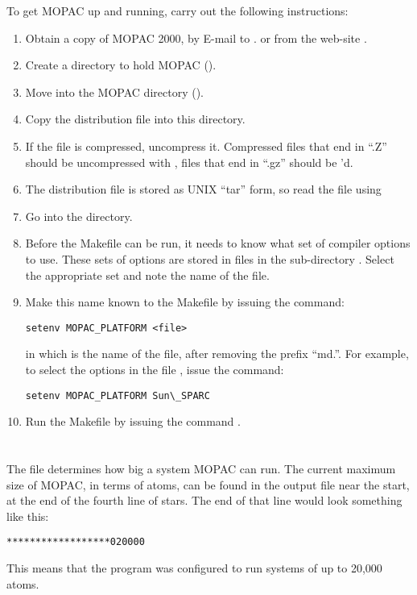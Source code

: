 To get MOPAC up and running, carry out the following instructions:
\begin{enumerate}
\item Obtain a copy of MOPAC 2000, by E-mail to 
.
or from the web-site 
.
\item Create a directory to hold MOPAC ().
\item Move into the MOPAC directory ().
\item Copy the distribution file into this directory.
\item If the file is compressed, uncompress it.  Compressed files that end in
``.Z'' should be uncompressed with , files that end in ``.gz''
should be 'd.
\item The distribution file is stored as UNIX ``tar'' form, so read the file
using 
\item Go into the  directory.
\item  Before the Makefile can be run, it needs to know what set of compiler
options to use. These sets of options are stored in files in the sub-directory 
.  Select the appropriate set and note the name of the
file.
\item Make this name known to the Makefile by issuing the command:
\begin{verbatim}
setenv MOPAC_PLATFORM <file>
\end{verbatim}
in which  is the name of the file, after removing the prefix
``md.''.
For example, to select the options in the file , issue the command:
\begin{verbatim}
setenv MOPAC_PLATFORM Sun\_SPARC
\end{verbatim}
\item Run the Makefile by issuing the command .
\end{enumerate}

\section{} \label{sizes}
The file  determines how big a system MOPAC can run.  
The current maximum size of MOPAC, in terms of atoms, can be
found in the output file near the start, at the end of the fourth line
of stars.  The end of that line would look something like this:
\begin{verbatim}
******************020000
\end{verbatim}
This means that the program was configured to run systems of up to 20,000 atoms.
 
